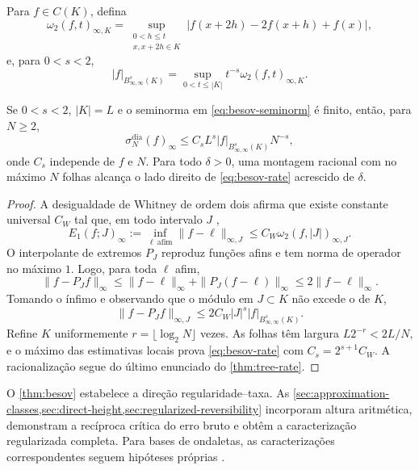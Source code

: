 Para $f\in C(K)$, defina
\begin{equation}
 \omega_2(f,t)_{\infty,K}
 =\sup_{\substack{0<h\le t\\x,x+2h\in K}}
 |f(x+2h)-2f(x+h)+f(x)|,
\end{equation}
e, para $0<s<2$,
\begin{equation}
 |f|_{B^s_{\infty,\infty}(K)}
 =\sup_{0<t\le|K|}t^{-s}\omega_2(f,t)_{\infty,K}.
 \label{eq:besov-seminorm}
\end{equation}

\begin{theorem}\label{thm:besov}
Se $0<s<2$, $|K|=L$ e o seminorma em \eqref{eq:besov-seminorm} é finito, então, para $N\ge2$,
\begin{equation}
 \sigma_N^{\mathrm{dia}}(f)_\infty
 \le C_sL^s|f|_{B^s_{\infty,\infty}(K)}N^{-s},
 \label{eq:besov-rate}
\end{equation}
onde $C_s$ independe de $f$ e $N$. Para todo $\delta>0$, uma montagem racional com no máximo $N$ folhas alcança o lado direito de \eqref{eq:besov-rate} acrescido de $\delta$.
\end{theorem}

\begin{proof}
A desigualdade de Whitney de ordem dois afirma que existe constante universal $C_W$ tal que, em todo intervalo $J$ \citep{whitney1957,devore1998},
\[
 E_1(f;J)_\infty:=\inf_{\ell\ \mathrm{afim}}\|f-\ell\|_{\infty,J}
 \le C_W\omega_2(f,|J|)_{\infty,J}.
\]
O interpolante de extremos $P_J$ reproduz funções afins e tem norma de operador no máximo $1$. Logo, para toda $\ell$ afim,
\[
 \|f-P_Jf\|_\infty
 \le\|f-\ell\|_\infty+\|P_J(f-\ell)\|_\infty
 \le2\|f-\ell\|_\infty.
\]
Tomando o ínfimo e observando que o módulo em $J\subset K$ não excede o de $K$,
\[
 \|f-P_Jf\|_{\infty,J}
 \le2C_W|J|^s|f|_{B^s_{\infty,\infty}(K)}.
\]
Refine $K$ uniformemente $r=\lfloor\log_2N\rfloor$ vezes. As folhas têm largura $L2^{-r}<2L/N$, e o máximo das estimativas locais prova \eqref{eq:besov-rate} com $C_s=2^{s+1}C_W$. A racionalização segue do último enunciado do \cref{thm:tree-rate}.
\end{proof}

O \cref{thm:besov} estabelece a direção regularidade--taxa. As
\cref{sec:approximation-classes,sec:direct-height,sec:regularized-reversibility}
incorporam altura aritmética, demonstram a recíproca crítica do erro bruto e
obtêm a caracterização regularizada completa. Para bases de ondaletas, as
caracterizações correspondentes seguem hipóteses próprias
\citep{devore1998,cohen2001}.
